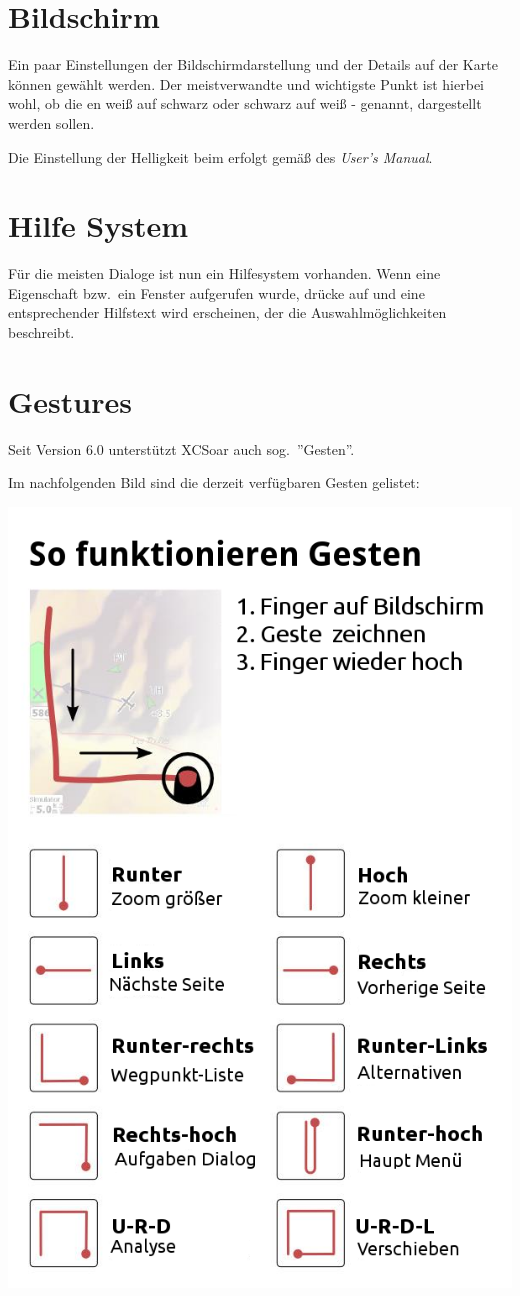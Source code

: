 \section{Bildschirm}

Ein paar Einstellungen der Bildschirmdarstellung und der Details auf der Karte können gewählt werden. Der meistverwandte und wichtigste Punkt ist hierbei wohl, ob die {\InfoBox}en weiß auf schwarz oder schwarz auf  weiß -  genannt, dargestellt werden sollen. 

Die Einstellung der Helligkeit beim \al erfolgt gemäß des {\em \al User's Manual}.


\section{Hilfe System}
  Für die meisten Dialoge ist nun ein Hilfesystem vorhanden.
  Wenn eine Eigenschaft bzw.\ ein Fenster aufgerufen wurde, drücke auf  und eine entsprechender Hilfstext wird erscheinen, der die Auswahlmöglichkeiten  beschreibt.

\section{Gestures}\label{sec:gestures}
Seit Version 6.0 unterstützt \textsf{XCSoar} auch sog.\  ''Gesten''.

Im nachfolgenden Bild sind die derzeit verfügbaren Gesten gelistet: 
\begin{center}
 \includegraphics[angle=0,width=0.75\linewidth,keepaspectratio='true']{figures/how2gestures.png}
\end{center}

